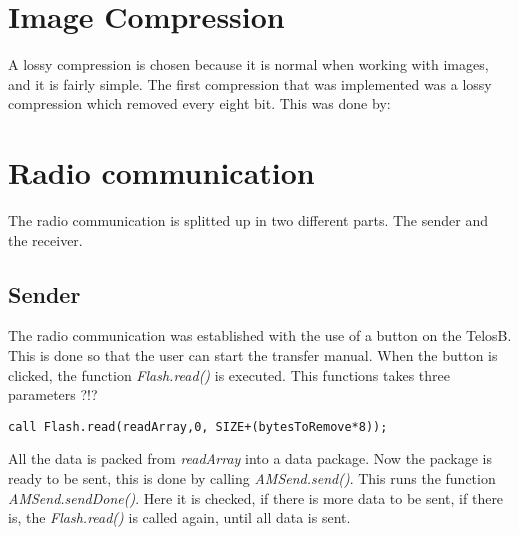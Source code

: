 \section{Image Compression}
A lossy compression is chosen because it is normal when working with images, and it is fairly simple. The first compression that was implemented was a lossy compression which removed every eight bit. This was done by:

\section{Radio communication}
The radio communication is splitted up in two different parts. The sender and the receiver.

\subsection{Sender}
The radio communication was established with the use of a button on the TelosB. This is done so that the 
user can start the transfer manual. When the button is clicked, the function \emph{Flash.read()} is executed. This functions takes three parameters ?!?

\begin{lstlisting}[caption={The function Flash.read}, label=lst:fread]
call Flash.read(readArray,0, SIZE+(bytesToRemove*8));
\end{lstlisting}

All the data is packed from \emph{readArray} into a data package. Now the package is ready to be sent, this is done by calling \emph{AMSend.send()}. This runs the function \emph{AMSend.sendDone()}. Here it is checked, if there is more data to be sent, if there is, the \emph{Flash.read()} is called again, until all data is sent. 

